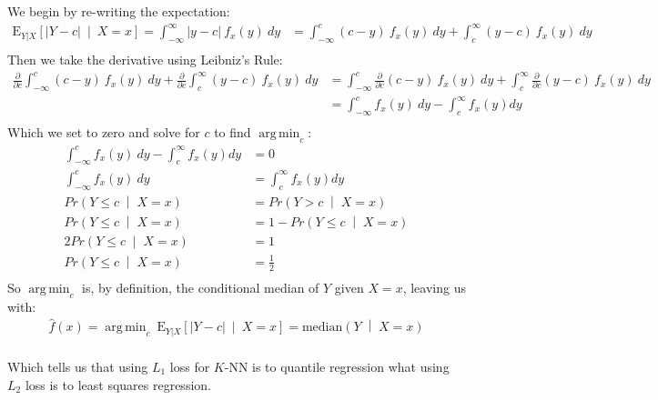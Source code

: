 \documentclass[a4paper]{article}
\DeclareMathOperator*{\argmin}{arg\,min}
\begin{document}
We begin by re-writing the expectation:
\begin{align*}
  \text{E}_{Y|X}\left[\lvert Y - c \rvert \:\middle|\: X=x\right] =
  \int_{-\infty}^{\infty} \lvert y - c \rvert \: f_x(y) \: dy
  &= \int_{-\infty}^{c} \left(c - y \right) \: f_x(y) \: dy +
     \int_{c}^{\infty} \left(y - c \right) \: f_x(y) \: dy\\
\end{align*}
Then we take the derivative using Leibniz's Rule:
\begin{align*}
  \frac{\partial}{\partial c} \int_{-\infty}^{c} \left(c - y \right) \: f_x(y) \: dy +
  \frac{\partial}{\partial c} \int_{c}^{\infty} \left(y - c \right) \: f_x(y) \: dy &=
  \int_{-\infty}^{c} \frac{\partial}{\partial c} \left(c - y \right) \: f_x(y) \: dy +
  \int_{c}^{\infty} \frac{\partial}{\partial c} \left(y - c \right) \: f_x(y) \: dy\\
  &= \int_{-\infty}^{c} f_x(y) \: dy - \int_{c}^{\infty} f_x(y) dy\\
\end{align*}
Which we set to zero and solve for $c$ to find $\argmin_c$:
\begin{align*}
  \int_{-\infty}^{c} f_x(y) \: dy - \int_{c}^{\infty} f_x(y) dy &= 0\\
  \int_{-\infty}^{c} f_x(y) \: dy &= \int_{c}^{\infty} f_x(y) dy\\
  Pr\left(Y \le c \;\middle|\; X=x\right) &= Pr\left(Y > c \;\middle|\; X=x\right)\\
  Pr\left(Y \le c \;\middle|\; X=x\right) &= 1 - Pr\left(Y \le c \;\middle|\; X=x\right)\\
  2Pr\left(Y \le c \;\middle|\; X=x\right) &= 1\\
  Pr\left(Y \le c \;\middle|\; X=x\right) &= \frac{1}{2}\\
\end{align*}
So $\argmin_c$ is, by definition, the conditional median of $Y$ given $X=x$, leaving us with:
\begin{align*}
  \hat{f}(x) = \argmin_c \: \text{E}_{Y|X}\left[\lvert Y - c \rvert \:\middle|\: X=x\right]
  = \text{median}\left(Y \;\middle|\; X=x\right)\\
\end{align*}

Which tells us that using $L_1$ loss for $K$-NN is to quantile regression what using $L_2$ loss is
to least squares regression.
\end{document}
